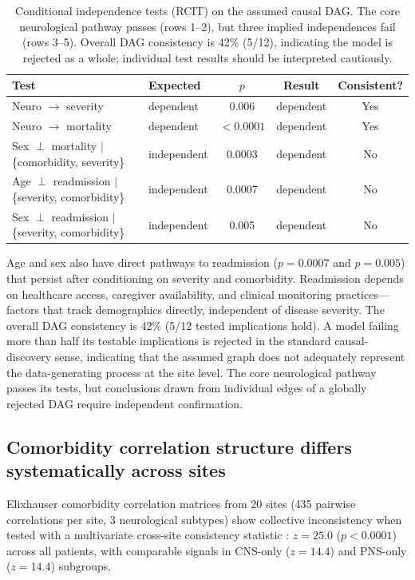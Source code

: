 \documentclass{article}
\begin{document}
\begin{table}[t]
\centering
\caption{Conditional independence tests (RCIT) on the assumed causal DAG. The core neurological pathway passes (rows 1--2), but three implied independences fail (rows 3--5). Overall DAG consistency is 42\% (5/12), indicating the model is rejected as a whole; individual test results should be interpreted cautiously.}
\label{tab:rcit}
\begin{tabular}{llccc}
\toprule
Test & Expected & $p$ & Result & Consistent? \\
\midrule
Neuro $\to$ severity & dependent & 0.006 & dependent & Yes \\
Neuro $\to$ mortality & dependent & $< 0.0001$ & dependent & Yes \\
\midrule
Sex $\perp$ mortality $\mid$ \{comorbidity, severity\} & independent & 0.0003 & dependent & No \\
Age $\perp$ readmission $\mid$ \{severity, comorbidity\} & independent & 0.0007 & dependent & No \\
Sex $\perp$ readmission $\mid$ \{severity, comorbidity\} & independent & 0.005 & dependent & No \\
\bottomrule
\end{tabular}
\end{table}

Age and sex also have direct pathways to readmission ($p = 0.0007$ and $p = 0.005$) that persist after conditioning on severity and comorbidity.
Readmission depends on healthcare access, caregiver availability, and clinical monitoring practices---factors that track demographics directly, independent of disease severity.
The overall DAG consistency is 42\% (5/12 tested implications hold).
A model failing more than half its testable implications is rejected in the standard causal-discovery sense, indicating that the assumed graph does not adequately represent the data-generating process at the site level.
The core neurological pathway passes its tests, but conclusions drawn from individual edges of a globally rejected DAG require independent confirmation.


\subsection{Comorbidity correlation structure differs systematically across sites}

Elixhauser comorbidity correlation matrices \cite{elixhauser1998} from 20 sites (435 pairwise correlations per site, 3 neurological subtypes) show collective inconsistency when tested with a multivariate cross-site consistency statistic \cite{robinson2017sheaf}: $z = 25.0$ ($p < 0.0001$) across all patients, with comparable signals in CNS-only ($z = 14.4$) and PNS-only ($z = 14.4$) subgroups.
\end{document}
